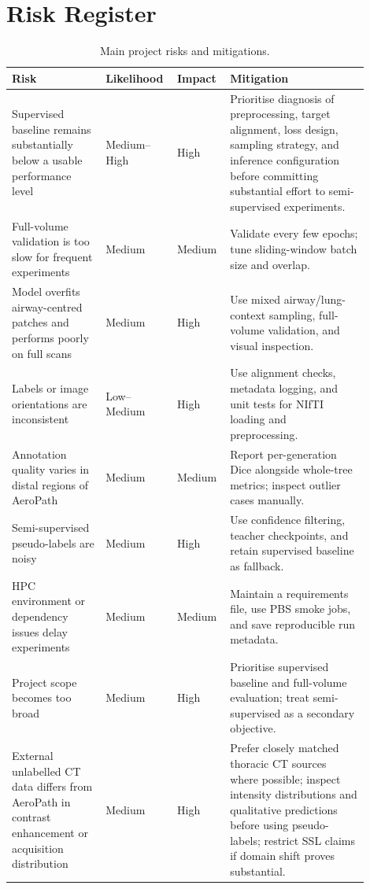 \documentclass[11pt,a4paper]{article}
\begin{document}
\section{Risk Register}

\begin{table}[H]
    \centering
    \small
    \begin{tabular}{p{0.25\linewidth} p{0.15\linewidth} p{0.13\linewidth} p{0.37\linewidth}}
        \toprule
        \textbf{Risk} & \textbf{Likelihood} & \textbf{Impact} & \textbf{Mitigation} \\
        \midrule
        Supervised baseline remains substantially below a usable performance level & Medium--High & High & Prioritise diagnosis of preprocessing, target alignment, loss design, sampling strategy, and inference configuration before committing substantial effort to semi-supervised experiments. \\
        Full-volume validation is too slow for frequent experiments & Medium & Medium & Validate every few epochs; tune sliding-window batch size and overlap. \\
        Model overfits airway-centred patches and performs poorly on full scans & Medium & High & Use mixed airway/lung-context sampling, full-volume validation, and visual inspection. \\
        Labels or image orientations are inconsistent & Low--Medium & High & Use alignment checks, metadata logging, and unit tests for NIfTI loading and preprocessing. \\
        Annotation quality varies in distal regions of AeroPath & Medium & Medium & Report per-generation Dice alongside whole-tree metrics; inspect outlier cases manually. \\
        Semi-supervised pseudo-labels are noisy & Medium & High & Use confidence filtering, teacher checkpoints, and retain supervised baseline as fallback. \\
        HPC environment or dependency issues delay experiments & Medium & Medium & Maintain a requirements file, use PBS smoke jobs, and save reproducible run metadata. \\
        Project scope becomes too broad & Medium & High & Prioritise supervised baseline and full-volume evaluation; treat semi-supervised as a secondary objective. \\
        External unlabelled CT data differs from AeroPath in contrast enhancement or acquisition distribution & Medium & High & Prefer closely matched thoracic CT sources where possible; inspect intensity distributions and qualitative predictions before using pseudo-labels; restrict SSL claims if domain shift proves substantial. \\
        \bottomrule
    \end{tabular}
    \caption{Main project risks and mitigations.}
\end{table}
\end{document}
